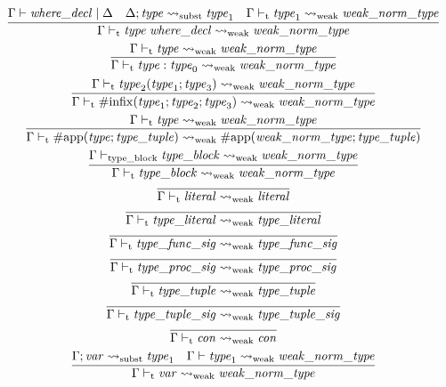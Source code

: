 \begin{gather*}
    \infer{\Gamma \vdash_\mathrm{t} \mathit{type}\; \mathit{where\_decl} \rightsquigarrow_\mathrm{weak} \mathit{weak\_norm\_type}}{
        \Gamma \vdash \mathit{where\_decl} \mid \Delta
        &
        \Delta; \mathit{type} \rightsquigarrow_\mathrm{subst} \mathit{type}_1
        &
        \Gamma \vdash_\mathrm{t} \mathit{type}_1 \rightsquigarrow_\mathrm{weak} \mathit{weak\_norm\_type}
    }
    \\
    \infer{\Gamma \vdash_\mathrm{t} \mathit{type}: \mathit{type}_0 \rightsquigarrow_\mathrm{weak} \mathit{weak\_norm\_type}}{
        \Gamma \vdash_\mathrm{t} \mathit{type} \rightsquigarrow_\mathrm{weak} \mathit{weak\_norm\_type}
    }
    \\
    \infer{\Gamma \vdash_\mathrm{t} \mathrm{\#infix}(\mathit{type}_1; \mathit{type}_2; \mathit{type}_3) \rightsquigarrow_\mathrm{weak} \mathit{weak\_norm\_type}}{
        \Gamma \vdash_\mathrm{t} \mathit{type}_2(\mathit{type}_1; \mathit{type}_3) \rightsquigarrow_\mathrm{weak} \mathit{weak\_norm\_type}
    }
    \\
    \infer{\Gamma \vdash_\mathrm{t} \mathrm{\#app}(\mathit{type}; \mathit{type\_tuple}) \rightsquigarrow_\mathrm{weak} \mathrm{\#app}(\mathit{weak\_norm\_type}; \mathit{type\_tuple})}{
        \Gamma \vdash_\mathrm{t} \mathit{type} \rightsquigarrow_\mathrm{weak} \mathit{weak\_norm\_type}
    }
    \\
    \infer{\Gamma \vdash_\mathrm{t} \mathit{type\_block} \rightsquigarrow_\mathrm{weak} \mathit{weak\_norm\_type}}{
        \Gamma \vdash_\mathrm{type\_block} \mathit{type\_block} \rightsquigarrow_\mathrm{weak} \mathit{weak\_norm\_type}
    }
    \\
    \infer{\Gamma \vdash_\mathrm{t} \mathit{literal} \rightsquigarrow_\mathrm{weak} \mathit{literal}}{}
    \\
    \infer{\Gamma \vdash_\mathrm{t} \mathit{type\_literal} \rightsquigarrow_\mathrm{weak} \mathit{type\_literal}}{}
    \\
    \infer{\Gamma \vdash_\mathrm{t} \mathit{type\_func\_sig} \rightsquigarrow_\mathrm{weak} \mathit{type\_func\_sig}}{}
    \\
    \infer{\Gamma \vdash_\mathrm{t} \mathit{type\_proc\_sig} \rightsquigarrow_\mathrm{weak} \mathit{type\_proc\_sig}}{}
    \\
    \infer{\Gamma \vdash_\mathrm{t} \mathit{type\_tuple} \rightsquigarrow_\mathrm{weak} \mathit{type\_tuple}}{}
    \\
    \infer{\Gamma \vdash_\mathrm{t} \mathit{type\_tuple\_sig} \rightsquigarrow_\mathrm{weak} \mathit{type\_tuple\_sig}}{}
    \\
    \infer{\Gamma \vdash_\mathrm{t} \mathit{con} \rightsquigarrow_\mathrm{weak} \mathit{con}}{}
    \\
    \infer{\Gamma \vdash_\mathrm{t} \mathit{var} \rightsquigarrow_\mathrm{weak} \mathit{weak\_norm\_type}}{
        \Gamma; \mathit{var} \rightsquigarrow_\mathrm{subst} \mathit{type}_1
        &
        \Gamma \vdash \mathit{type}_1 \rightsquigarrow_\mathrm{weak} \mathit{weak\_norm\_type}
    }
\end{gather*}

